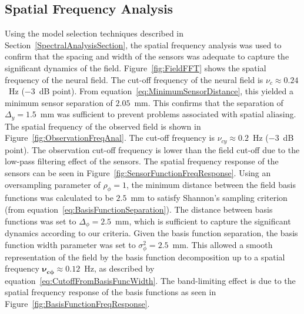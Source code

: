 \documentclass[10pt]{article}
\begin{document}
\subsection*{Spatial Frequency Analysis} 
Using the model selection techniques described in Section~\ref{SpectralAnalysisSection}, the spatial frequency analysis was used to confirm that the spacing and width of the sensors was adequate to capture the significant dynamics of the field. Figure~\ref{fig:FieldFFT} shows the spatial frequency of the neural field. The cut-off frequency of the neural field is $\nu_c \approx 0.24$~Hz ($-3$~dB point). From equation~\ref{eq:MinimumSensorDistance}, this yielded a minimum sensor separation of $2.05$~mm. This confirms that the separation of $\Delta_{y} = 1.5$~mm was sufficient to prevent problems associated with spatial aliasing.
The spatial frequency of the observed field is shown in Figure~\ref{fig:ObservationFreqAnal}. The cut-off frequency is $\nu_{cy} \approx 0.2$~Hz ($-3$~dB point). The observation cut-off frequency is lower than the field cut-off due to the low-pass filtering effect of the sensors. The spatial frequency response of the sensors can be seen in Figure~\ref{fig:SensorFunctionFreqResponse}. Using an oversampling parameter of $\rho_{\phi}=1$, the minimum distance between the field basis functions was calculated to be $2.5$~mm to satisfy Shannon's sampling criterion (from equation~\ref{eq:BasisFunctionSeparation}). The distance between basis functions was set to $\Delta_{\phi}=2.5$~mm, which is sufficient to capture the significant dynamics according to our criteria.
Given the basis function separation, the basis function width parameter was set to $\sigma_{\phi}^2=2.5$~mm. This allowed a smooth representation of the field by the basis function decomposition up to a spatial frequency $\mathbf{\nu_{c\phi}} \approx 0.12$~Hz, as described by equation~\ref{eq:CutoffFromBasisFuncWidth}. The band-limiting effect is due to the spatial frequency response of the basis functions as seen in Figure~\ref{fig:BasisFunctionFreqResponse}.
\end{document}
